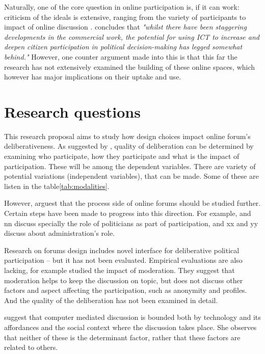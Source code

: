 \documentclass[journal,a4paper]{IEEEtran}
\begin{document}
Naturally, one of the core question in online participation is, if it can work: criticism of the ideals is extensive, ranging from the variety of participants to impact of online discussion .  concludes that \textit{"whilst there have been staggering developments in the commercial work, the potential for using ICT to increase and deepen citizen participation in political decision-making has legged somewhat behind."} However, one counter argument made into this is that this far the research has not extensively examined the building of these online spaces, which however has major implications on their uptake and use.

\section{Research questions}

This research proposal aims to study how design choices impact online forum's deliberativeness. As suggested by , quality of deliberation can be determined by examining who participate, how they participate and what is the impact of participation. These will be among the dependent variables. There are variety of potential variations (independent variables), that can be made. Some of these are listen in the table\ref{tab:modalities}.

However,  arguest that the process side of online forums should be studied further. Certain steps have been made to progress into this direction. For example,  and nn discuss specially the role of politicians as part of participation, and xx and yy discuss about administration's role.

Research on forums design includes  novel interface for deliberative political participation -- but it has not been evaluated. Empirical evaluations are also lacking, for example  studied the impact of moderation. They suggest that moderation helps to keep the discussion on topic, but does not discuss other factors and aspect affecting the participation, such as anonymity and profiles. And the quality of the deliberation has not been examined in detail.

 suggest that computer mediated discussion is bounded both by technology and its affordances and the social context where the discussion takes place. She observes that neither of these is the determinant factor, rather that these factors are related to others.
\end{document}
